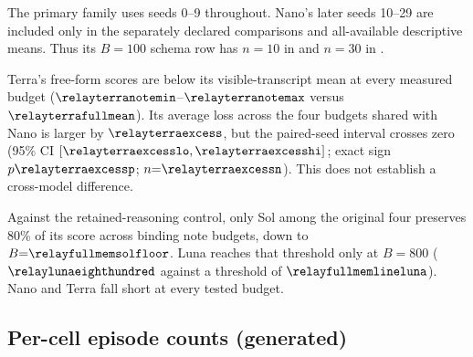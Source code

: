 \begin{table}[htbp]
\centering
\small
\caption{Paired differences in board accuracy (fraction of keys correct) for the four added models, with $n{=}10$ shared seeds per row. Note conditions use $B{=}100$. Each declared family is Holm-corrected over its four model rows. F9: free-form notes $-$ retained reasoning (F7's comparison). F10: schema $-$ free-form notes. F11: schema $-$ retained reasoning (F5's comparison). F12: retained reasoning $-$ visible transcript (F6's comparison).}
\label{tab:added}

\end{table}

The primary family uses seeds 0--9 throughout. Nano's later seeds 10--29 are included only in the separately declared comparisons and all-available descriptive means. Thus its $B{=}100$ schema row has $n{=}10$ in  and $n{=}30$ in .

Terra's free-form scores are below its visible-transcript mean at every measured budget ($\relayterranotemin$--$\relayterranotemax$ versus $\relayterrafullmean$). Its average loss across the four budgets shared with Nano is larger by $\relayterraexcess$, but the paired-seed interval crosses zero (95\% CI $[\relayterraexcesslo,\relayterraexcesshi]$; exact sign $p\relayterraexcessp$; $n{=}\relayterraexcessn$). This does not establish a cross-model difference.

Against the retained-reasoning control, only Sol among the original four preserves 80\% of its score across binding note budgets, down to $B{=}\relayfullmemsolfloor$. Luna reaches that threshold only at $B{=}800$ ($\relaylunaeighthundred$ against a threshold of $\relayfullmemlineluna$). Nano and Terra fall short at every tested budget.

\FloatBarrier

\subsection{Per-cell episode counts (generated)}\label{app:cells}
\noindent\begin{minipage}{\linewidth}\centering\small
\captionsetup{hypcap=false}%
\label{tab:cells}

\end{minipage}

